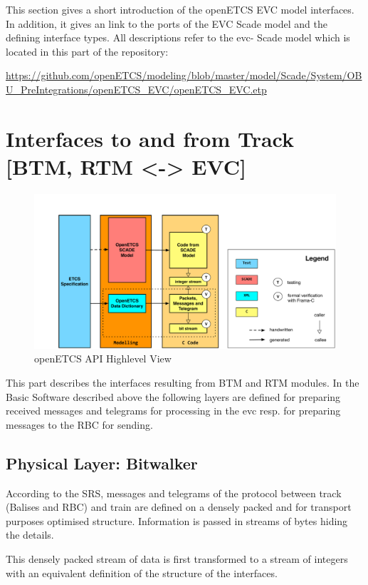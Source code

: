 \documentclass{template/openetcs_report}
\begin{document}
This section gives a short introduction of the openETCS EVC model interfaces. In addition, it gives an link to the ports of the EVC Scade model and the defining interface types. All descriptions refer to the evc- Scade model which is located in this part of the repository:

\url{https://github.com/openETCS/modeling/blob/master/model/Scade/System/OBU_PreIntegrations/openETCS_EVC/openETCS_EVC.etp}

\section{Interfaces to and from Track [BTM, RTM <-> EVC]}

\begin{figure}[hbtp]
\centering
\includegraphics[width=\linewidth]{OpenETCS-Stack.pdf}
\caption{openETCS API Highlevel View}
\label{fig:apiHighLevel}
\end{figure}

This part describes the interfaces resulting from BTM and RTM modules. In the Basic Software described above the following layers are defined for preparing received messages and telegrams for processing in the evc resp. for preparing messages to the RBC for sending.

\subsection{Physical Layer: Bitwalker}
According to the SRS, messages and telegrams of the protocol between track (Balises and RBC) and train are defined on a densely packed and for transport purposes optimised structure. Information is passed in streams of bytes hiding the details. 

This densely packed stream of data is first transformed to a stream of integers with an equivalent definition of the structure of the interfaces.
\end{document}
